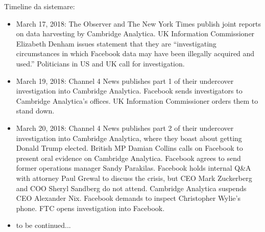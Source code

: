 \documentclass[11pt, twoside]{report}
\begin{document}
Timeline da sistemare: \cite{nyt_timeline}
\begin{itemize}

\item March 17, 2018: The Observer and The New York Times publish joint reports on data harvesting by Cambridge Analytica. UK Information Commissioner Elizabeth Denham issues statement that they are “investigating circumstances in which Facebook data may have been illegally acquired and used.” Politicians in US and UK call for investigation.

\item March 19, 2018: Channel 4 News publishes part 1 of their undercover investigation into Cambridge Analytica. Facebook sends investigators to Cambridge Analytica’s offices. UK Information Commissioner orders them to stand down.

\item March 20, 2018: Channel 4 News publishes part 2 of their undercover investigation into Cambridge Analytica, where they boast about getting Donald Trump elected. British MP Damian Collins calls on Facebook to present oral evidence on Cambridge Analytica. Facebook agrees to send former operations manager Sandy Parakilas. Facebook holds internal Q\&A with attorney Paul Grewal to discuss the crisis, but CEO Mark Zuckerberg and COO Sheryl Sandberg do not attend. Cambridge Analytica suspends CEO Alexander Nix. Facebook demands to inspect Christopher Wylie’s phone. FTC opens investigation into Facebook.
\item to be continued...
\end{itemize}
\end{document}
